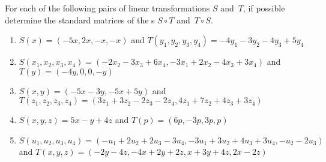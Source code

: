 \begin{exercise} \label{ex:} 
For each of the following pairs of linear transformations \(S\) and~\(T\), if possible determine the standard matrices of the s \(S\circ T\) and~\(T\circ S\).
\begin{enumerate}
\item \(S(x)=(-5x,2x,-x,-x)\) and 
\(T(y_1,y_2,y_3,y_4)=-4y_1-3y_2-4y_3+5y_4\)

\item \(S(x_1,x_2,x_3,x_4)=(-2x_2-3x_3+6x_4, -3x_1+2x_2-4x_3+3x_4)\) and \(T(y)=(-4y,0,0,-y)\)

\item \(S(x,y)=(-5x-3y,-5x+5y)\) and \(T(z_1,z_2,z_3,z_4) =(3z_1+3z_2-2z_3-2z_4, 4z_1+7z_2+4z_3+3z_4)\)

\item \(S(x,y,z)=5x-y+4z\) and \(T(p)=(6p,-3p,3p,p)\)

\item \(S(u_1,u_2,u_3,u_4)=(-u_1+2u_2+2u_3-3u_4, -3u_1+3u_2+4u_3+3u_4, -u_2-2u_3)\) and \(T(x,y,z)=(-2y-4z, -4x+2y+2z, x+3y+4z, 2x-2z)\)


\end{enumerate}
\end{exercise}
